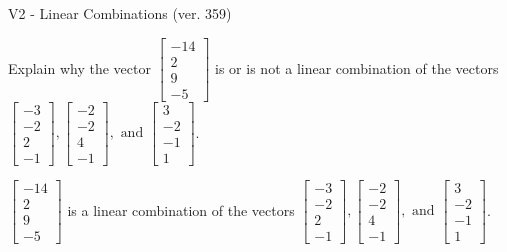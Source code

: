 \begin{exercise}
  \begin{exerciseTitle}V2 - Linear Combinations (ver. 359)\end{exerciseTitle}
  \begin{exerciseStatement}
    Explain why the vector \(\left[\begin{array}{c}
-14 \\
2 \\
9 \\
-5
\end{array}\right]\)  is or is not a linear 
	combination of the vectors \(\left[\begin{array}{c}
-3 \\
-2 \\
2 \\
-1
\end{array}\right] , \left[\begin{array}{c}
-2 \\
-2 \\
4 \\
-1
\end{array}\right] , \text{ and } \left[\begin{array}{c}
3 \\
-2 \\
-1 \\
1
\end{array}\right]\).
	


  \end{exerciseStatement}
  \begin{exerciseAnswer}
   \(\left[\begin{array}{c}
-14 \\
2 \\
9 \\
-5
\end{array}\right]\) 
  	 is  
	a linear combination of the vectors \(\left[\begin{array}{c}
-3 \\
-2 \\
2 \\
-1
\end{array}\right] , \left[\begin{array}{c}
-2 \\
-2 \\
4 \\
-1
\end{array}\right] , \text{ and } \left[\begin{array}{c}
3 \\
-2 \\
-1 \\
1
\end{array}\right]\).

	
  


  \end{exerciseAnswer}
\end{exercise}